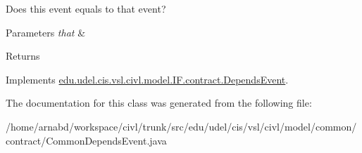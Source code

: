 Does this event equals to that event? 


\begin{DoxyParams}{Parameters}
{\em that} & \\
\hline
\end{DoxyParams}
\begin{DoxyReturn}{Returns}

\end{DoxyReturn}


Implements \hyperlink{interfaceedu_1_1udel_1_1cis_1_1vsl_1_1civl_1_1model_1_1IF_1_1contract_1_1DependsEvent_a99e451d0530a7a8b6215d5518f51db05}{edu.\+udel.\+cis.\+vsl.\+civl.\+model.\+I\+F.\+contract.\+Depends\+Event}.



The documentation for this class was generated from the following file\+:\begin{DoxyCompactItemize}
\item 
/home/arnabd/workspace/civl/trunk/src/edu/udel/cis/vsl/civl/model/common/contract/Common\+Depends\+Event.\+java\end{DoxyCompactItemize}
